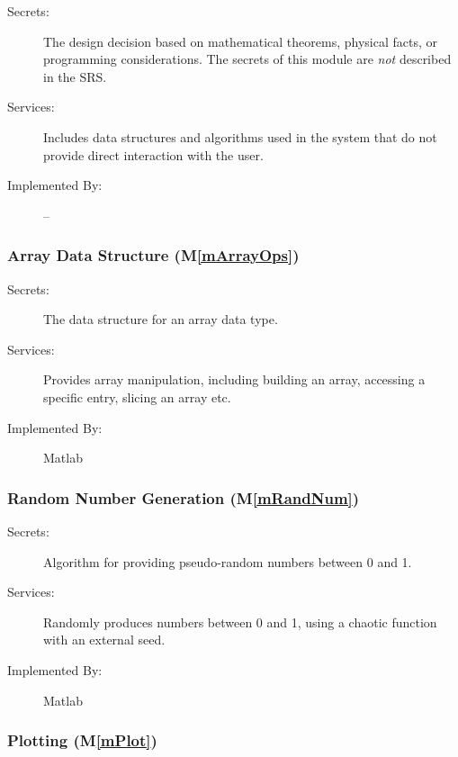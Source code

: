 \documentclass[12pt, titlepage]{article}
\newcommand{\mref}[1]{M\ref{#1}}
\begin{document}
\begin{description}
\item[Secrets:] The design decision based on mathematical theorems,
  physical facts, or programming considerations. The secrets of this
  module are \emph{not} described in the SRS.
\item[Services:] Includes data structures and algorithms used in the
  system that do not provide direct interaction with the user.
\item[Implemented By:] --
\end{description}


\subsubsection{Array Data Structure (\mref{mArrayOps})}


\begin{description}
\item[Secrets:] The data structure for an array data type.
\item[Services:] Provides array manipulation, including building an
  array, accessing a specific entry, slicing an array etc.
\item[Implemented By:] Matlab
\end{description}


\subsubsection{Random Number Generation (\mref{mRandNum})}

\begin{description}
\item[Secrets:] Algorithm for providing pseudo-random numbers between 0 and 1.
\item[Services:] Randomly produces numbers between 0 and 1, using a
  chaotic function with an external seed.
\item[Implemented By:] Matlab
\end{description}


\subsubsection{Plotting (\mref{mPlot})}
\end{document}

